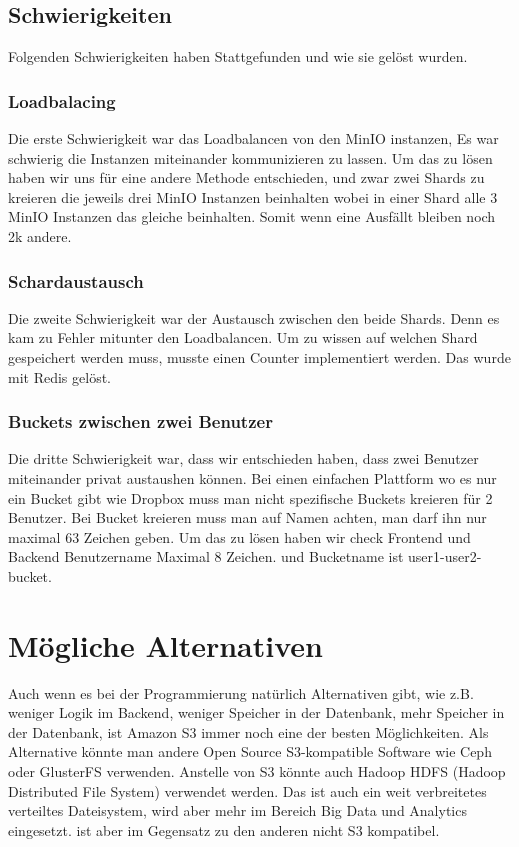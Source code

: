 \documentclass[12pt]{report}
\begin{document}
			\subsection{Schwierigkeiten}
				Folgenden Schwierigkeiten haben Stattgefunden und wie sie gelöst wurden.
				
				\subsubsection{Loadbalacing}
					Die erste Schwierigkeit war das Loadbalancen von den MinIO instanzen, Es war schwierig die Instanzen miteinander kommunizieren zu lassen. Um das zu lösen haben wir uns für eine andere Methode entschieden, und zwar zwei Shards zu kreieren die jeweils drei MinIO Instanzen beinhalten wobei in einer Shard alle 3 MinIO Instanzen das gleiche beinhalten. Somit wenn eine Ausfällt bleiben noch 2k andere.
			
				\subsubsection{Schardaustausch}
					Die zweite Schwierigkeit war der Austausch zwischen den beide Shards. Denn es kam zu Fehler mitunter den Loadbalancen. Um zu wissen auf welchen Shard gespeichert werden muss, musste einen Counter implementiert werden. Das wurde mit Redis gelöst.
				
				\subsubsection{Buckets zwischen zwei Benutzer}
					Die dritte Schwierigkeit war, dass wir entschieden haben, dass zwei Benutzer miteinander privat austaushen können. Bei einen einfachen Plattform wo es nur ein Bucket gibt wie Dropbox muss man nicht spezifische Buckets kreieren für 2 Benutzer. Bei Bucket kreieren muss man auf Namen achten, man darf ihn nur maximal 63 Zeichen geben. Um das zu lösen haben wir check Frontend und Backend Benutzername Maximal 8 Zeichen. und Bucketname ist user1-user2-bucket.
			
	\section{Mögliche Alternativen}
		Auch wenn es bei der Programmierung natürlich Alternativen gibt, wie z.B. weniger Logik im Backend, weniger Speicher in der Datenbank, mehr Speicher in der Datenbank, ist Amazon S3 immer noch eine der besten Möglichkeiten. Als Alternative könnte man andere Open Source S3-kompatible Software wie Ceph oder GlusterFS verwenden. Anstelle von S3 könnte auch Hadoop HDFS (Hadoop Distributed File System) verwendet werden. Das ist auch ein weit verbreitetes verteiltes Dateisystem, wird aber mehr im Bereich Big Data und Analytics eingesetzt. ist aber im Gegensatz zu den anderen nicht S3 kompatibel.
	
\end{document}
